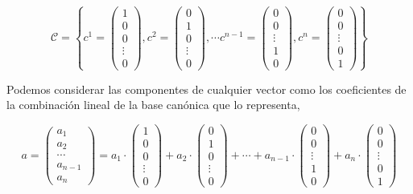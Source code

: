 \begin{equation*}
\mathcal{C}=\left\lbrace c^1=\begin{pmatrix}
1\\
0\\
0\\
\vdots \\
0
\end{pmatrix}, c^2=\begin{pmatrix}
0\\
1\\
0\\
\vdots \\
0
\end{pmatrix},
\cdots
c^{n-1}=\begin{pmatrix}
0\\
0\\
\vdots \\
1\\
0
\end{pmatrix},
c^n=\begin{pmatrix}
0\\
0\\
\vdots \\
0\\
1
\end{pmatrix} \right\rbrace
\end{equation*} 
\begin{paracol}{2}
Podemos considerar las componentes de cualquier vector como los coeficientes de la combinación lineal de la base canónica que lo representa,
\end{paracol}
\begin{equation*}
a=\begin{pmatrix}
a_1\\
a_2\\
\cdots  \\
a_{n-1}\\
a_n
\end{pmatrix} =a_1\cdot \begin{pmatrix}
1\\
0\\
0\\
\vdots \\
0
\end{pmatrix}+a_2 \cdot  \begin{pmatrix}
0\\
1\\
0\\
\vdots \\
0
\end{pmatrix}+
\cdots +
a_{n-1}\cdot \begin{pmatrix}
0\\
0\\
\vdots \\
1\\
0
\end{pmatrix}+
a_n\cdot \begin{pmatrix}
0\\
0\\
\vdots \\
0\\
1
\end{pmatrix}
\end{equation*}


